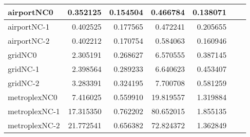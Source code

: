 \begin{longtable}{|l|r|r|r|r|r|r|}
airportNC0 & 0.352125 & 0.154504 & 0.466784 & 0.138071 \\ \hline
airportNC-1 & 0.402525 & 0.177565 & 0.472241 & 0.205655 \\ \hline
airportNC-2 & 0.402212 & 0.170754 & 0.584063 & 0.160946 \\ \hline
gridNC0 & 2.305191 & 0.268627 & 6.570555 & 0.387145 \\ \hline
gridNC-1 & 2.398564 & 0.289233 & 6.640623 & 0.453407 \\ \hline
gridNC-2 & 3.283391 & 0.324195 & 7.700708 & 0.581259 \\ \hline
metroplexNC0 & 7.416025 & 0.559910 & 19.819557 & 1.319884 \\ \hline
metroplexNC-1 & 17.315350 & 0.762202 & 80.652015 & 1.855135 \\ \hline
metroplexNC-2 & 21.772541 & 0.656382 & 72.824372 & 1.362849 \\ \hline
\end{longtable}
